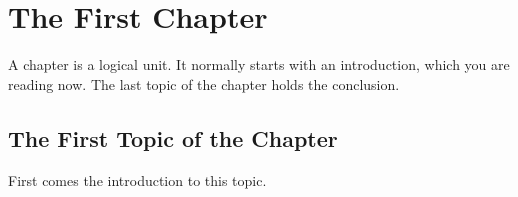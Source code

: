 %
%
%
%
%
%
%
%
%	
%
%
%

\chapter{The First Chapter}
\label{cha:1}
A chapter is a logical unit. It normally starts with an introduction, which
you are reading now. The last topic of the chapter holds the conclusion.

\section{The First Topic of the Chapter}
First comes the introduction to this topic.

\lipsum[55]

